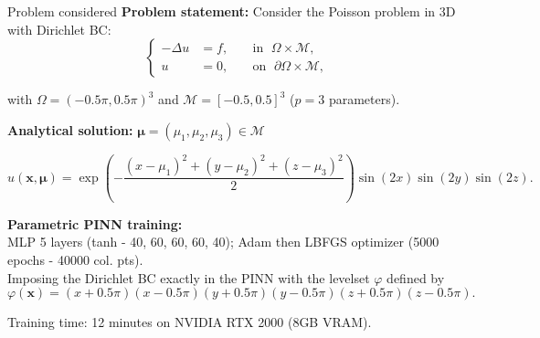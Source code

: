 \begin{frame}{Problem considered}
	\textbf{Problem statement:} Consider the Poisson problem in 3D with Dirichlet BC:
	\vspace{-5pt}
	\begin{equation*}
		\left\{
		\begin{aligned}
			-\Delta u & = f, \; &  & \text{in } \; \Omega \times \mathcal{M},         \\
			u         & =0, \;  &  & \text{on } \; \partial\Omega \times \mathcal{M},
		\end{aligned}
		\right.
	\end{equation*}

	\vspace{-5pt}
	with $\Omega=(-0.5 \pi, 0.5 \pi)^3$ and $\mathcal{M}=[-0.5,0.5]^3$ ($p=3$ parameters).

	\vspace{4pt}
	\textbf{Analytical solution:} $\bm{\mu}=(\mu_1,\mu_2,\mu_3) \in \mathcal{M}$

	\vspace{-5pt}
	\begin{equation*}
		u(\bm{x},\bm{\mu})=\exp\left(-\frac{{(x-\mu_1)}^2+{(y-\mu_2)}^2+{(z-\mu_3)}^2}{2}\right)\sin(2x)\sin(2y)\sin(2z).
	\end{equation*}

	\vspace{6pt}
	\textbf{Parametric PINN training:} \\
	MLP 5 layers (tanh - 40, 60, 60, 60, 40); Adam then LBFGS optimizer (5000 epochs - 40000 col. pts). \\
	Imposing the Dirichlet BC exactly in the PINN with the levelset $\varphi$ defined by
	\vspace{-10pt}
	$$\varphi(\bm{x})=(x+0.5\pi)(x-0.5\pi)(y+0.5\pi)(y-0.5\pi)(z+0.5\pi)(z-0.5\pi).$$

	\vspace{-10pt}\small
	Training time: 12 minutes on NVIDIA RTX 2000 (8GB VRAM).
\end{frame}

